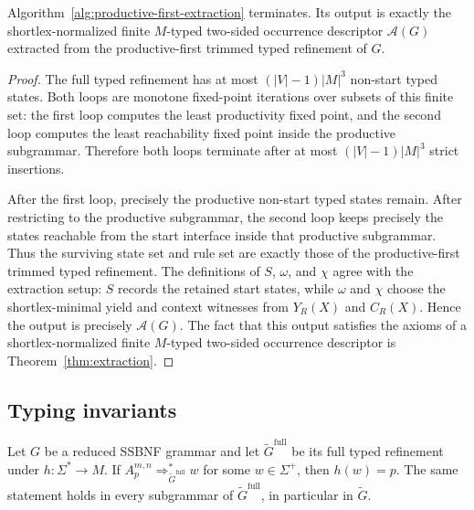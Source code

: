 \documentclass[sub]{jalc}
\newcommand{\Gfull}{\widetilde G^{\mathrm{full}}}
\newcommand{\Gtrim}{\widetilde G}
\begin{document}
\begin{proposition}
\label{prop:algorithmic-extraction-correct}
Algorithm~\ref{alg:productive-first-extraction} terminates. Its output is
exactly the shortlex-normalized finite \(M\)-typed two-sided occurrence descriptor
\(\mathcal A(G)\) extracted from the productive-first trimmed typed refinement
of \(G\).
\end{proposition}

\begin{proof}
The full typed refinement has at most \((|V|-1)|M|^3\) non-start typed states.
Both loops are monotone fixed-point iterations over subsets of this finite set:
the first loop computes the least productivity fixed point, and the second loop
computes the least reachability fixed point inside the productive subgrammar.
Therefore both loops terminate after at most \((|V|-1)|M|^3\) strict insertions.

After the first loop, precisely the productive non-start typed states remain.
After restricting to the productive subgrammar, the second loop keeps precisely
the states reachable from the start interface inside that productive subgrammar.
Thus the surviving state set and rule set are exactly those of the
productive-first trimmed typed refinement. The definitions of \(S\), \(\omega\),
and \(\chi\) agree with the extraction setup: \(S\) records the retained start
states, while \(\omega\) and \(\chi\) choose the shortlex-minimal yield and
context witnesses from \(Y_R(X)\) and \(C_R(X)\). Hence the output is precisely
\(\mathcal A(G)\). The fact that this output satisfies the axioms of a
shortlex-normalized finite \(M\)-typed two-sided occurrence descriptor is
Theorem~\ref{thm:extraction}.
\end{proof}

\subsection{Typing invariants}
\label{subsec:typing-invariants}

\begin{lemma}
\label{lem:yield-typing-invariant}
Let \(G\) be a reduced SSBNF grammar and let \(\Gfull\) be its full typed refinement under \(h:\Sigma^*\to M\). If \(A_p^{m,n}\Rightarrow_{\Gfull}^* w\) for some \(w\in\Sigma^+\), then \(h(w)=p\). The same statement holds in every subgrammar of \(\Gfull\), in particular in \(\Gtrim\).
\end{lemma}
\end{document}
